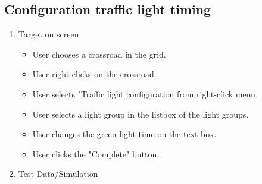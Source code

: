 \newpage

\subsection{Configuration traffic light timing}

\begin{enumerate}

	\item Target on screen
	\begin{itemize}
		\item User chooses a crossroad in the grid.
		\item User right clicks on the crossroad.
		\item User selects "Traffic light configuration from right-click menu.
		\item User selects a light group in the listbox of the light groups.
		\item User changes the green light time on the text box.
		\item User clicks the "Complete" button. 
	\end{itemize}
	\item Test Data/Simulation
\end{enumerate}	
